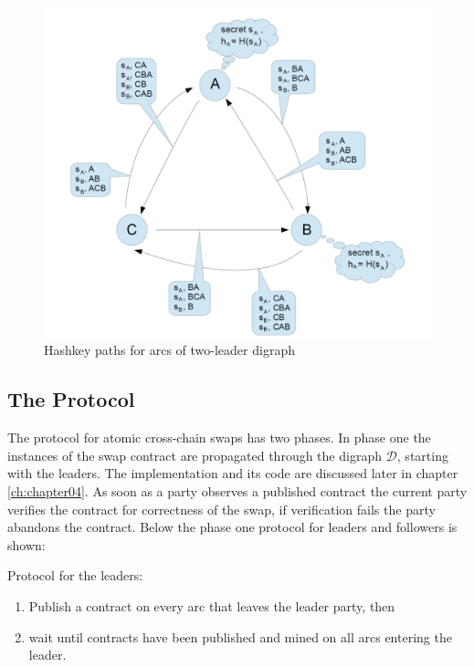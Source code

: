 \begin{figure}[h]
	\includegraphics[width=0.6\paperwidth]{hashkey_paths}	%
	\caption{Hashkey paths for arcs of two-leader digraph}
	\label{fig:hashkey_paths}
\end{figure}

\subsection{The Protocol}
\label{subsec:background:second_section:protocol}
The protocol for atomic cross-chain swaps has two phases. In phase one the instances of the swap contract are propagated through the digraph $\mathcal{D}$, starting with the leaders. The implementation and its code are discussed later in chapter \ref{ch:chapter04}. As soon as a party observes a published contract the current party verifies the contract for correctness of the swap, if verification fails the party abandons the contract. Below the phase one protocol for leaders and followers is shown: \newline

Protocol for the leaders:
\begin{enumerate}
	\item Publish a contract on every arc that leaves the leader party, then
	\item wait until contracts have been published and mined on all arcs entering the leader.
\end{enumerate}

